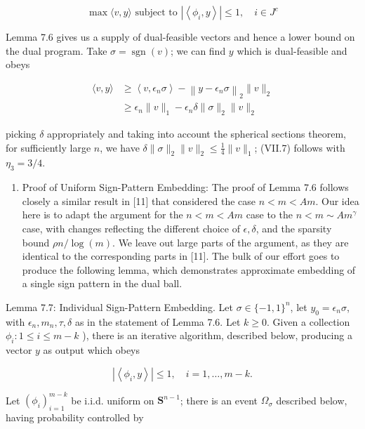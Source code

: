 \documentclass[10pt]{article}
\begin{document}
$$
\max \langle v, y\rangle \text { subject to }\left|\left\langle\phi_{i}, y\right\rangle\right| \leq 1, \quad i \in J^{c}
$$

Lemma 7.6 gives us a supply of dual-feasible vectors and hence a lower bound on the dual program. Take $\sigma=\operatorname{sgn}(v)$; we can find $y$ which is dual-feasible and obeys

$$
\begin{aligned}
\langle v, y\rangle & \geq\left\langle v, \epsilon_{n} \sigma\right\rangle-\left\|y-\epsilon_{n} \sigma\right\|_{2}\|v\|_{2} \\
& \geq \epsilon_{n}\|v\|_{1}-\epsilon_{n} \delta\|\sigma\|_{2}\|v\|_{2}
\end{aligned}
$$

picking $\delta$ appropriately and taking into account the spherical sections theorem, for sufficiently large $n$, we have $\delta\|\sigma\|_{2}\|v\|_{2} \leq \frac{1}{4}\|v\|_{1}$; (VII.7) follows with $\eta_{3}=3 / 4$.

\begin{enumerate}
  \item Proof of Uniform Sign-Pattern Embedding: The proof of Lemma 7.6 follows closely a similar result in [11] that considered the case $n<m<A m$. Our idea here is to adapt the argument for the $n<m<A m$ case to the $n<m \sim A m^{\gamma}$ case, with changes reflecting the different choice of $\epsilon, \delta$, and the sparsity bound $\rho n / \log (m)$. We leave out large parts of the argument, as they are identical to the corresponding parts in [11]. The bulk of our effort goes to produce the following lemma, which demonstrates approximate embedding of a single sign pattern in the dual ball.
\end{enumerate}

Lemma 7.7: Individual Sign-Pattern Embedding. Let $\sigma \in \{-1,1\}^{n}$, let $y_{0}=\epsilon_{n} \sigma$, with $\epsilon_{n}, m_{n}, \tau, \delta$ as in the statement of Lemma 7.6. Let $k \geq 0$. Given a collection $\phi_{i}: 1 \leq i \leq m- k$ ), there is an iterative algorithm, described below, producing a vector $y$ as output which obeys


\begin{equation*}
\left|\left\langle\phi_{i}, y\right\rangle\right| \leq 1, \quad i=1, \ldots, m-k . \tag{VII.9}
\end{equation*}


Let $\left(\phi_{i}\right)_{i=1}^{m-k}$ be i.i.d. uniform on $\boldsymbol{S}^{n-1}$; there is an event $\Omega_{\sigma}$ described below, having probability controlled by
\end{document}

